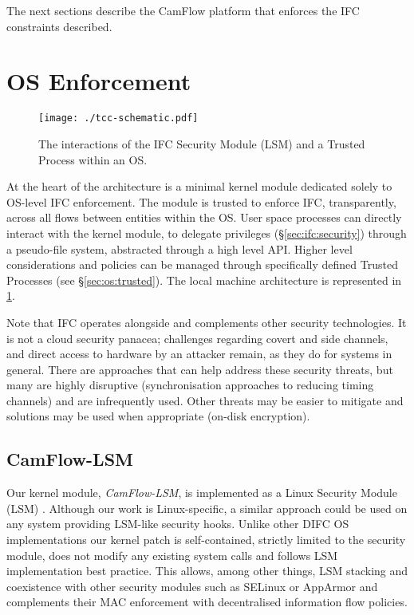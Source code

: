 \documentclass[10pt,journal,compsoc]{IEEEtran}
\begin{document}
\vspace{1.5mm}
The next sections describe the CamFlow platform that enforces the IFC constraints described. 


 
\section{OS Enforcement}
\label{sec:os}
\begin{figure}[t]
\centering
  \texttt{[image: ./tcc-schematic.pdf]}
\caption{
The interactions of the IFC Security Module (LSM) and a Trusted Process within an OS.
}
  \label{image:lsmarch}
\end{figure}




 



At the heart of the architecture  
is a minimal kernel module dedicated solely to OS-level IFC enforcement. 
The module is trusted to enforce IFC, transparently, across all flows between entities within the OS. User space processes can directly interact with the kernel module, \eg to delegate privileges (\S\ref{sec:ifc:security}) through a pseudo-file system, abstracted through a high level API. 
Higher level considerations and policies can be managed through specifically defined Trusted Processes (see \S\ref{sec:os:trusted}).
The local machine architecture is represented in \fig\ref{image:lsmarch}. 




Note that IFC operates alongside and complements other security technologies. It is not a cloud security panacea; challenges regarding 
covert and side channels, and direct access to hardware by an attacker
remain, as they do for systems in general.
There are approaches that can help address these security threats, but many are highly disruptive (\eg synchronisation approaches to reducing timing channels) and are infrequently used.
Other threats may be easier to mitigate and solutions may be used when appropriate (\eg on-disk encryption).



\subsection{CamFlow-LSM} 
Our kernel module, {\em CamFlow-LSM}, is implemented as a  Linux Security Module (LSM) \cite{wright2003linux}.
Although our work is Linux-specific, a similar approach could be used on any system providing LSM-like security hooks.
Unlike other DIFC OS implementations \cite{Krohn:2007:IFC:1294261.1294293, porter2014practical} our kernel patch
is self-contained, strictly limited to the security module, does not modify any existing system calls and follows LSM implementation best practice.
This allows, among other things, LSM stacking \cite{quaritsch2004linux, schaufler2014} and coexistence with other security modules such as \eg SELinux \cite{smalley2001implementing} or AppArmor \cite{bauer2006paranoid} and complements their MAC enforcement with decentralised information flow policies.
\end{document}
